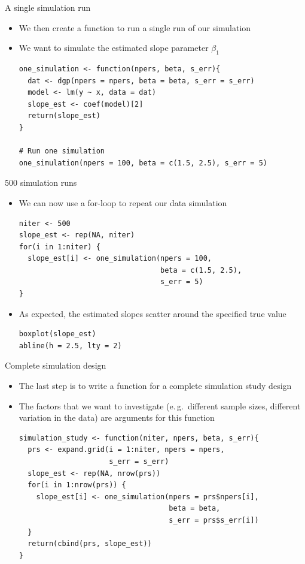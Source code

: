 \documentclass[aspectratio=169]{beamer}
\begin{document}
\begin{frame}[fragile]{A single simulation run}
  \begin{itemize}
    \item We then create a function to run a single run of our simulation
    \item We want to simulate the estimated slope parameter $\beta_1$
\begin{lstlisting}
one_simulation <- function(npers, beta, s_err){
  dat <- dgp(npers = npers, beta = beta, s_err = s_err)
  model <- lm(y ~ x, data = dat)
  slope_est <- coef(model)[2]
  return(slope_est)
}

# Run one simulation
one_simulation(npers = 100, beta = c(1.5, 2.5), s_err = 5)
\end{lstlisting}
  \end{itemize}
\end{frame}

\begin{frame}[fragile]{500 simulation runs}
  \begin{itemize}
    \item We can now use a for-loop to repeat our data simulation
\begin{lstlisting}
niter <- 500
slope_est <- rep(NA, niter)
for(i in 1:niter) {
  slope_est[i] <- one_simulation(npers = 100, 
                                 beta = c(1.5, 2.5), 
                                 s_err = 5)
}
\end{lstlisting}
\item As expected, the estimated slopes scatter around the specified true value
\begin{lstlisting}
boxplot(slope_est)
abline(h = 2.5, lty = 2)
\end{lstlisting}
  \end{itemize}
\end{frame}

\begin{frame}[fragile]{Complete simulation design}
  \begin{itemize}
    \item The last step is to write a function for a complete simulation study
      design
    \item The factors that we want to investigate (e.\,g.\ different sample
      sizes, different variation in the data) are arguments for this function
\begin{lstlisting}
simulation_study <- function(niter, npers, beta, s_err){
  prs <- expand.grid(i = 1:niter, npers = npers, 
                     s_err = s_err)
  slope_est <- rep(NA, nrow(prs))
  for(i in 1:nrow(prs)) {
    slope_est[i] <- one_simulation(npers = prs$npers[i],
                                   beta = beta,
                                   s_err = prs$s_err[i])
  }
  return(cbind(prs, slope_est))
}
\end{lstlisting}
  \end{itemize}
\end{frame}
\end{document}
